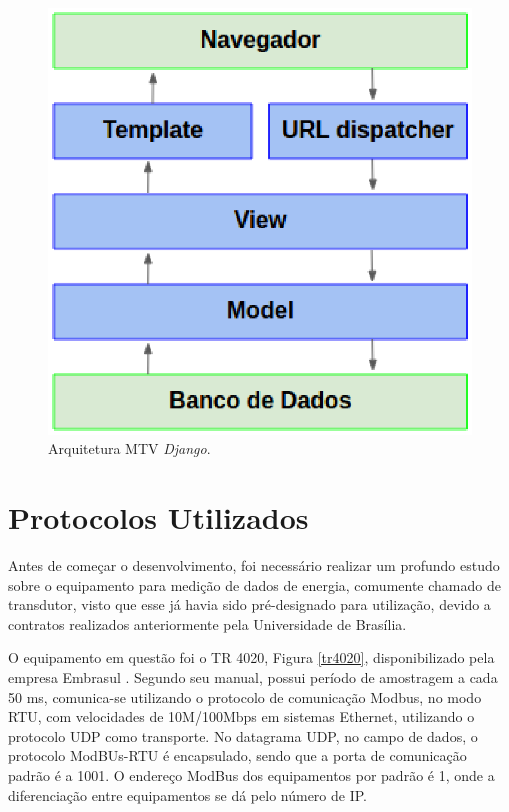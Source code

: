    \begin{figure}[h]
        \centering
        \includegraphics[keepaspectratio=true,scale=0.5]{figuras/django-arquitetura.eps}
        \caption{Arquitetura MTV \textit{Django}.}
        \label{django-arq}
    \end{figure}

\section{Protocolos Utilizados}
Antes de começar o desenvolvimento, foi necessário realizar um profundo estudo sobre o equipamento para medição de dados de energia, comumente chamado de transdutor, visto que esse já havia sido pré-designado para utilização, devido a contratos realizados anteriormente pela Universidade de Brasília.

O equipamento em questão foi o TR 4020, Figura \ref{tr4020}, disponibilizado pela empresa Embrasul \cite{embrasul}. Segundo seu manual, possui período de amostragem a cada 50 ms, comunica-se utilizando o protocolo de comunicação Modbus, no modo RTU, com velocidades de 10M/100Mbps em sistemas Ethernet, utilizando o protocolo UDP como transporte. No datagrama UDP, no campo de dados, o protocolo ModBUs-RTU é encapsulado, sendo que a porta de comunicação padrão é a 1001. O endereço ModBus dos equipamentos por padrão é 1, onde a diferenciação entre equipamentos se dá pelo número de IP.

